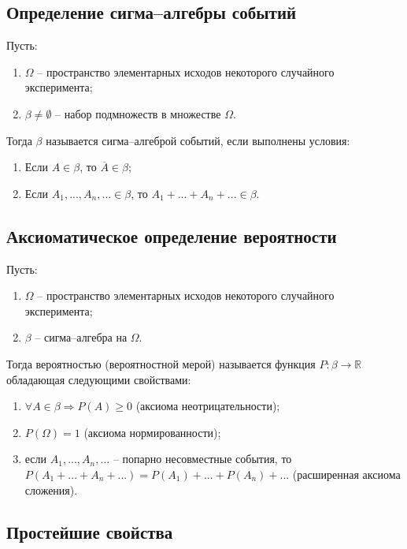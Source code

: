\subsection*{Определение сигма--алгебры событий}

Пусть:
\begin{enumerate}[label=\arabic*)]
	\item $\Omega$ -- пространство элементарных исходов некоторого случайного эксперимента;
	\item $\beta \neq \emptyset$ -- набор подмножеств в множестве $\Omega$.
\end{enumerate}

Тогда $\beta$ называется сигма--алгеброй событий, если выполнены условия:

\begin{enumerate}[label=\arabic*)]
	\item Если $A \in \beta$, то $\overline{A} \in \beta$;
	\item Если $A_1, ..., A_n, ... \in \beta$, то $A_1 + ... + A_n + ... \in \beta$.
\end{enumerate}

\subsection*{Аксиоматическое определение вероятности}

Пусть:
\begin{enumerate}[label=\arabic*)]
	\item $\Omega$ -- пространство элементарных исходов некоторого случайного эксперимента;
	\item $\beta$ -- сигма--алгебра на $\Omega$.
\end{enumerate}

Тогда вероятностью (вероятностной мерой) называется функция $P: \beta \rightarrow \mathbb{R}$ обладающая следующими свойствами: 

\begin{enumerate}[label=\arabic*)]
	\item $\forall A \in \beta \Rightarrow P(A) \geq 0$ (аксиома неотрицательности);
	\item $P(\Omega) = 1$ (аксиома нормированности);
	\item если $A_1, ..., A_n,...$ -- попарно несовместные события, то $P(A_1 +...+A_n +...) = P(A_1)+...+P(A_n)+...$ (расширенная аксиома сложения).
\end{enumerate}

\subsection*{Простейшие свойства}

